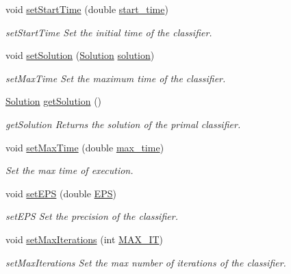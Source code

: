 \begin{DoxyCompactItemize}
void \hyperlink{class_classifier_a92fd489e75afe8b1bd2c88c478cf8f60}{set\+Start\+Time} (double \hyperlink{class_classifier_a7ed1462d90a26a7f3050be4c29ad6ff7}{start\+\_\+time})
\begin{DoxyCompactList}\small\item\em set\+Start\+Time Set the initial time of the classifier. \end{DoxyCompactList}\item 
void \hyperlink{class_classifier_a2eb8d760224eba3091c108155996d3d9}{set\+Solution} (\hyperlink{class_solution}{Solution} \hyperlink{class_classifier_adecdc97505c2911a66e240ad0fefd9ea}{solution})
\begin{DoxyCompactList}\small\item\em set\+Max\+Time Set the maximum time of the classifier. \end{DoxyCompactList}\item 
\hyperlink{class_solution}{Solution} \hyperlink{class_classifier_a225887f545e5ad0a2bb414f969771cca}{get\+Solution} ()
\begin{DoxyCompactList}\small\item\em get\+Solution Returns the solution of the primal classifier. \end{DoxyCompactList}\item 
void \hyperlink{class_classifier_a1919729daad9103144bffbd189b9fac9}{set\+Max\+Time} (double \hyperlink{class_classifier_ab7c1a6d53cbf26ea2517df83a9ab8ee0}{max\+\_\+time})
\begin{DoxyCompactList}\small\item\em Set the max time of execution. \end{DoxyCompactList}\item 
void \hyperlink{class_classifier_a47b520ded0313a3cdcab8691cdd28257}{set\+E\+PS} (double \hyperlink{class_classifier_a690342152fdf43a17e67afad15d86503}{E\+PS})
\begin{DoxyCompactList}\small\item\em set\+E\+PS Set the precision of the classifier. \end{DoxyCompactList}\item 
void \hyperlink{class_classifier_af3ea28f2e4b7ea19469892ec901b5bb6}{set\+Max\+Iterations} (int \hyperlink{class_classifier_a3b7f1c31910fff58907bcfe2cfc6cf89}{M\+A\+X\+\_\+\+IT})
\begin{DoxyCompactList}\small\item\em set\+Max\+Iterations Set the max number of iterations of the classifier. \end{DoxyCompactList}\item 

\end{DoxyCompactItemize}
